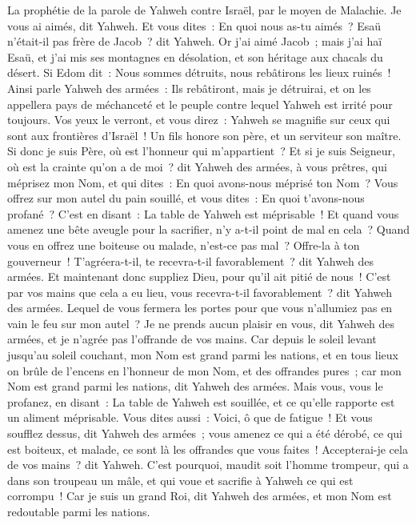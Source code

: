 \begin{multicols}{2}
\VerseOne{}La prophétie de la parole de Yahweh contre Israël, par le moyen de Malachie.
Je vous ai aimés, dit Yahweh. Et vous dites~: En quoi nous as-tu aimés~? Esaü n'était-il pas frère de Jacob~? dit Yahweh. Or j'ai aimé Jacob~;
mais j'ai haï Esaü, et j'ai mis ses montagnes en désolation, et son héritage aux chacals du désert.
Si Edom dit~: Nous sommes détruits, nous rebâtirons les lieux ruinés~! Ainsi parle Yahweh des armées~: Ils rebâtiront, mais je détruirai, et on les appellera pays de méchanceté et le peuple contre lequel Yahweh est irrité pour toujours.
Vos yeux le verront, et vous direz~: Yahweh se magnifie sur ceux qui sont aux frontières d'Israël~!
Un fils honore son père, et un serviteur son maître. Si donc je suis Père, où est l'honneur qui m'appartient~? Et si je suis Seigneur, où est la crainte qu'on a de moi~? dit Yahweh des armées, à vous prêtres, qui méprisez mon Nom, et qui dites~: En quoi avons-nous méprisé ton Nom~?
Vous offrez sur mon autel du pain souillé, et vous dites~: En quoi t'avons-nous profané~? C'est en disant~: La table de Yahweh est méprisable~!
Et quand vous amenez une bête aveugle pour la sacrifier, n'y a-t-il point de mal en cela~? Quand vous en offrez une boiteuse ou malade, n'est-ce pas mal~? Offre-la à ton gouverneur~! T'agréera-t-il, te recevra-t-il favorablement~? dit Yahweh des armées.
Et maintenant donc suppliez Dieu, pour qu'il ait pitié de nous~! C'est par vos mains que cela a eu lieu, vous recevra-t-il favorablement~? dit Yahweh des armées.
Lequel de vous fermera les portes pour que vous n'allumiez pas en vain le feu sur mon autel~? Je ne prends aucun plaisir en vous, dit Yahweh des armées, et je n'agrée pas l'offrande de vos mains.
Car depuis le soleil levant jusqu'au soleil couchant, mon Nom est grand parmi les nations, et en tous lieux on brûle de l'encens en l'honneur de mon Nom, et des offrandes pures~; car mon Nom est grand parmi les nations, dit Yahweh des armées.
Mais vous, vous le profanez, en disant~: La table de Yahweh est souillée, et ce qu'elle rapporte est un aliment méprisable.
Vous dites aussi~: Voici, ô que de fatigue~! Et vous soufflez dessus, dit Yahweh des armées~; vous amenez ce qui a été dérobé, ce qui est boiteux, et malade, ce sont là les offrandes que vous faites~! Accepterai-je cela de vos mains~? dit Yahweh.
C'est pourquoi, maudit soit l'homme trompeur, qui a dans son troupeau un mâle, et qui voue et sacrifie à Yahweh ce qui est corrompu~! Car je suis un grand Roi, dit Yahweh des armées, et mon Nom est redoutable parmi les nations.

\end{multicols}
